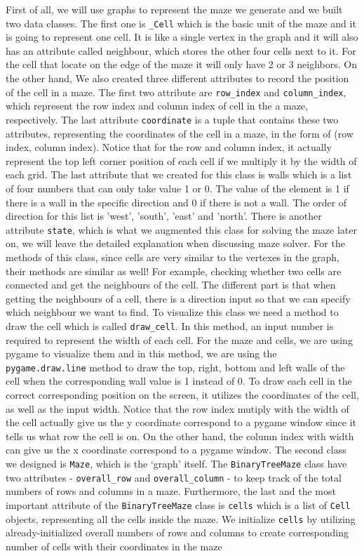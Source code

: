 \documentclass[fontsize=11pt]{article}
\begin{document}
First of all, we will use graphs to represent the maze we generate and we built two data classes. The first one is \texttt{\_Cell} which is the basic unit of the maze and it is going to represent one cell. It is like a single vertex in the graph and it will also has an attribute called neighbour, which stores the other four cells next to it. For the cell that locate on the edge of the maze it will only have 2 or 3 neighbors.  On the other hand, We also created three different attributes to record the position of the cell in a maze. The first two attribute are \texttt{row\_index} and \texttt{column\_index}, which represent the row index and column index of cell in the a maze, respectively. The last attribute \texttt{coordinate} is a tuple that contains these two attributes, representing the coordinates of the cell in a maze, in the form of (row index, column index). Notice that for the row and column index, it actually represent the top left corner position of each cell if we multiply it by the width of each grid. The last attribute that we created for this class is walls which is a list of four numbers that can only take value 1 or 0. The value of the element is 1 if there is a wall in the specific direction and 0 if there is not a wall. The order of direction for this list is 'west', 'south', 'east' and 'north'. There is another attribute \texttt{state}, which is what we augmented this class for solving the maze later on, we will leave the detailed explanation when discussing maze solver. For the methods of this class, since cells are very similar to the vertexes in the graph, their methods are similar as well! For example, checking whether two cells are connected and get the neighbours of the cell. The different part is that when getting the neighbours of a cell, there is a direction input so that we can specify which neighbour we want to find. To visualize this class we need a method to draw the cell which is called \texttt{draw\_cell}. In this method, an input number is required to represent the width of each cell. For the maze and cells, we are using pygame to visualize them and in this method, we are using the \texttt{pygame.draw.line} method to draw the top, right, bottom and left walls of the cell when the corresponding wall value is 1 instead of 0. To draw each cell in the correct corresponding position on the screen, it utilizes the coordinates of the cell, as well as the input width. Notice that the row index mutiply with the width of the cell actually give us the y coordinate correspond to a pygame window since it tells us what row the cell is on. On the other hand, the column index with width can give us the x coordinate correspond to a pygame window. The second class we designed is \texttt{Maze}, which is the `graph' itself. The \texttt{BinaryTreeMaze} class have two attributes -  \texttt{overall\_row} and \texttt{overall\_column} - to keep track of the total numbers of rows and columns in a maze. Furthermore, the last and the most important attribute of the \texttt{BinaryTreeMaze} class is \texttt{cells} which is a list of \texttt{Cell} objects, representing all the cells inside the maze. We initialize \texttt{cells} by utilizing already-initialized overall numbers of rows and columns to create corresponding number of cells with their coordinates in the maze 
\end{document}
